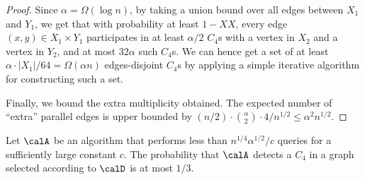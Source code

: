 \begin{proof}
Since $\alpha = \Omega(\log n)$, by taking a union bound over all edges between $X_1$ and $Y_1$, we get that 
with probability at least $1-XX$, every edge $(x,y)\in X_1\times Y_1$ participates in at least $\alpha/2$ $C_4$s with a vertex in $X_2$ and a vertex in $Y_2$, and at most $32\alpha$ such $C_4$s. We can hence get a set of at least $\alpha\cdot |X_1|/64 = \Omega(\alpha n)$ edges-disjoint $C_4$s by applying a simple iterative algorithm for constructing such a set. 

Finally, we  bound the extra multiplicity obtained.
The expected number of ``extra'' parallel edges is upper bounded by 
$(n/2)\cdot {\alpha\choose 2} \cdot 4/ n^{1/2} \leq \alpha^2 n^{1/2}$. 
\end{proof}



\begin{claim}\label{clm:D-C4-lb}
Let $\calA$ be an algorithm  that performs less than $n^{1/4}\alpha^{1/2}/c$ queries for a sufficiently large constant $c$. The probability that $\calA$ detects a $C_4$ in a graph selected according to $\calD$
is at most $1/3$.
\end{claim}

